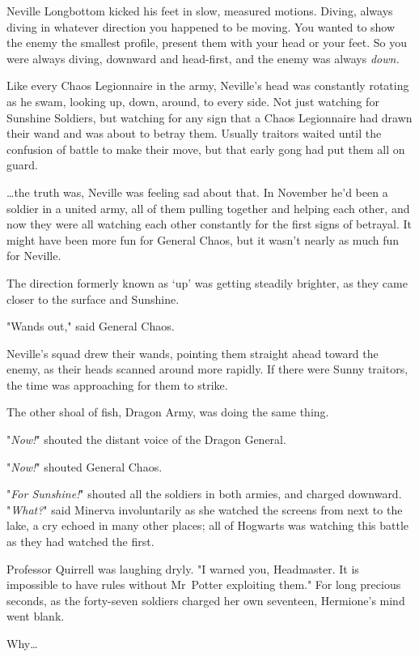 Neville Longbottom kicked his feet in slow, measured motions. Diving, always
diving in whatever direction you happened to be moving. You wanted to show the
enemy the smallest profile, present them with your head or your feet. So you
were always diving, downward and head-first, and the enemy was always
\emph{down.}

Like every Chaos Legionnaire in the army, Neville's head was constantly
rotating as he swam, looking up, down, around, to every side. Not just watching
for Sunshine Soldiers, but watching for any sign that a Chaos Legionnaire had
drawn their wand and was about to betray them. Usually traitors waited until
the confusion of battle to make their move, but that early gong had put them
all on guard.

…the truth was, Neville was feeling sad about that. In November he'd
been a soldier in a united army, all of them pulling together and helping each
other, and now they were all watching each other constantly for the first signs
of betrayal. It might have been more fun for General Chaos, but it wasn't
nearly as much fun for Neville.

The direction formerly known as `up' was getting steadily brighter, as they
came closer to the surface and Sunshine.

"Wands out," said General Chaos.

Neville's squad drew their wands, pointing them straight ahead toward the
enemy, as their heads scanned around more rapidly. If there were Sunny
traitors, the time was approaching for them to strike.

The other shoal of fish, Dragon Army, was doing the same thing.

"\emph{Now!}" shouted the distant voice of the Dragon General.

"\emph{Now!}" shouted General Chaos.

"\emph{For Sunshine!}" shouted all the soldiers in both armies, and charged
downward.
\later
"\emph{What?}" said Minerva involuntarily as she watched the screens from next
to the lake, a cry echoed in many other places; all of Hogwarts was watching
this battle as they had watched the first.

Professor Quirrell was laughing dryly. "I warned you, Headmaster. It is
impossible to have rules without Mr~Potter exploiting them."
\later
For long precious seconds, as the forty-seven soldiers charged her own
seventeen, Hermione's mind went blank.

Why…


